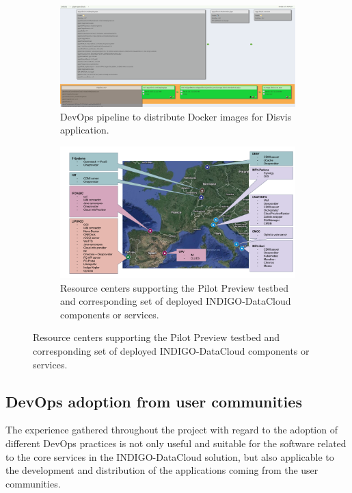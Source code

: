 \documentclass[journal]{IEEEtran}
\begin{document}
\begin{figure}	
	\centering
	\begin{subfigure}
		\centering
\includegraphics[width=\textwidth]{images/disvis.png}
\caption{DevOps pipeline to distribute Docker images for Disvis application.}
\label{fig:fig_disvis}		
	\end{subfigure}
	\quad
	\begin{subfigure}
		\centering
\includegraphics[width=\textwidth]{images/pilotpreview.png}
\caption{Resource centers supporting the Pilot Preview testbed and corresponding
set of deployed INDIGO-DataCloud components or services.}
\label{fig:fig_pilotpreview}
	\end{subfigure}
\end{figure}


\subsection{DevOps adoption from user communities}

The experience gathered throughout the project with regard to the adoption of
different DevOps practices is not only useful and suitable for the software related
to the core services in the INDIGO-DataCloud solution, but also applicable to the
development and distribution of the applications coming from the user communities.
\end{document}
